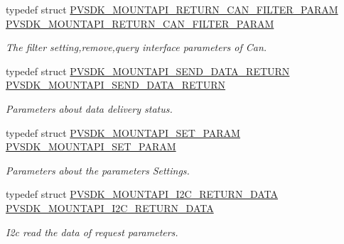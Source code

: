 \begin{DoxyCompactItemize}
typedef struct \hyperlink{struct_p_v_s_d_k___m_o_u_n_t_a_p_i___r_e_t_u_r_n___c_a_n___f_i_l_t_e_r___p_a_r_a_m}{P\+V\+S\+D\+K\+\_\+\+M\+O\+U\+N\+T\+A\+P\+I\+\_\+\+R\+E\+T\+U\+R\+N\+\_\+\+C\+A\+N\+\_\+\+F\+I\+L\+T\+E\+R\+\_\+\+P\+A\+R\+AM} \hyperlink{group___p_v_s_d_k___c_o_r_e___a_p_i___m_o_u_n_t_c_o_n_t_r_o_l_ga53a7f71c00d7469b570e776c4bae576f}{P\+V\+S\+D\+K\+\_\+\+M\+O\+U\+N\+T\+A\+P\+I\+\_\+\+R\+E\+T\+U\+R\+N\+\_\+\+C\+A\+N\+\_\+\+F\+I\+L\+T\+E\+R\+\_\+\+P\+A\+R\+AM}
\begin{DoxyCompactList}\small\item\em The filter setting,remove,query interface parameters of Can. \end{DoxyCompactList}\item 
typedef struct \hyperlink{struct_p_v_s_d_k___m_o_u_n_t_a_p_i___s_e_n_d___d_a_t_a___r_e_t_u_r_n}{P\+V\+S\+D\+K\+\_\+\+M\+O\+U\+N\+T\+A\+P\+I\+\_\+\+S\+E\+N\+D\+\_\+\+D\+A\+T\+A\+\_\+\+R\+E\+T\+U\+RN} \hyperlink{group___p_v_s_d_k___c_o_r_e___a_p_i___m_o_u_n_t_c_o_n_t_r_o_l_ga359ac5c34f5baea0fa787e79e357da1b}{P\+V\+S\+D\+K\+\_\+\+M\+O\+U\+N\+T\+A\+P\+I\+\_\+\+S\+E\+N\+D\+\_\+\+D\+A\+T\+A\+\_\+\+R\+E\+T\+U\+RN}
\begin{DoxyCompactList}\small\item\em Parameters about data delivery status. \end{DoxyCompactList}\item 
typedef struct \hyperlink{struct_p_v_s_d_k___m_o_u_n_t_a_p_i___s_e_t___p_a_r_a_m}{P\+V\+S\+D\+K\+\_\+\+M\+O\+U\+N\+T\+A\+P\+I\+\_\+\+S\+E\+T\+\_\+\+P\+A\+R\+AM} \hyperlink{group___p_v_s_d_k___c_o_r_e___a_p_i___m_o_u_n_t_c_o_n_t_r_o_l_gaaffaeb71cfde93d88aa78ef027228056}{P\+V\+S\+D\+K\+\_\+\+M\+O\+U\+N\+T\+A\+P\+I\+\_\+\+S\+E\+T\+\_\+\+P\+A\+R\+AM}
\begin{DoxyCompactList}\small\item\em Parameters about the parameters Settings. \end{DoxyCompactList}\item 
typedef struct \hyperlink{struct_p_v_s_d_k___m_o_u_n_t_a_p_i___i2_c___r_e_t_u_r_n___d_a_t_a}{P\+V\+S\+D\+K\+\_\+\+M\+O\+U\+N\+T\+A\+P\+I\+\_\+\+I2\+C\+\_\+\+R\+E\+T\+U\+R\+N\+\_\+\+D\+A\+TA} \hyperlink{group___p_v_s_d_k___c_o_r_e___a_p_i___m_o_u_n_t_c_o_n_t_r_o_l_gab4946d50ede65b348cba5417bc99e8ed}{P\+V\+S\+D\+K\+\_\+\+M\+O\+U\+N\+T\+A\+P\+I\+\_\+\+I2\+C\+\_\+\+R\+E\+T\+U\+R\+N\+\_\+\+D\+A\+TA}
\begin{DoxyCompactList}\small\item\em I2c read the data of request parameters. \end{DoxyCompactList}\item 

\end{DoxyCompactItemize}
